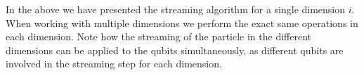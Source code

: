 In the above we have presented the streaming algorithm for a single dimension $i$. When working with multiple dimensions we perform the exact same operations in each dimension. Note how the streaming of the particle in the different dimensions can be applied to the qubits simultaneously, as different qubits are involved in the streaming step for each dimension. 




